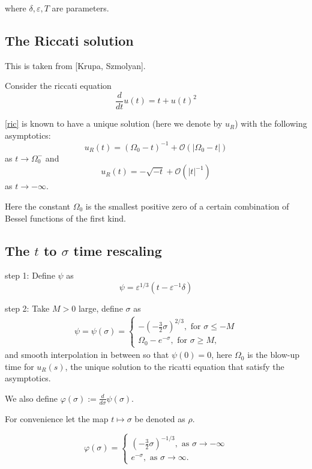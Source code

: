 \documentclass[letterpaper,11pt]{article}
\newcommand{\rmO}{\mathcal{O}}
\newcommand{\eps}{\varepsilon}
\numberwithin{equation}{section}
\theoremstyle{plain}
\begin{document}
where $\delta,\eps, T$ are parameters.

\subsection{The Riccati solution}
This is taken from [Krupa, Szmolyan].

Consider the riccati equation
\begin{equation}\label{ric}
\frac{d}{dt}u(t) = t+u(t)^2
\end{equation}

\eqref{ric} is known to have a unique solution (here we denote by $u_R$) with the following asymptotics:
\[
u_R(t) = (\Omega_0-t)^{-1} + \rmO(|\Omega_0-t|)
\] as $t \to \Omega_0^-$ and
\[
u_R(t) = -\sqrt{-t} + \rmO( |t|^{-1})
\] as $t \to -\infty$.

Here the constant $\Omega_0$ is the smallest positive zero of a certain combination of Bessel functions of the first kind. 

\subsection{The \texorpdfstring{$t$}{t} to \texorpdfstring{$\sigma$}{sigma} time rescaling}

step 1: Define $\psi$ as
\[
\psi = \eps^{1/3}(t - \eps^{-1}\delta)
\]

step 2:
Take $M>0$ large, define $\sigma$ as
\begin{align*}
\psi = \psi(\sigma) =\begin{cases}
-(-\frac{3}{2} \sigma)^{2/3} , \text{ for }\sigma \le -M\\
\Omega_0 -e^{-\sigma}, \text{ for }\sigma \ge M,
\end{cases}
\end{align*}
and smooth interpolation in between so that $\psi(0) = 0$, here $\Omega_0$ is the blow-up time for $u_R(s)$, the unique solution to the ricatti equation that satisfy the asymptotics.

We also define $\varphi(\sigma) := \frac{d}{d\sigma}\psi(\sigma)$.

For convenience let the map $t \mapsto \sigma$ be denoted as $\rho$.

\iffalse
\begin{equation*}
\varphi(\sigma) =\begin{cases}
 (-\frac{3}{2}\sigma)^{-1/3}, \text{ as }\sigma \to -\infty\\
e^{-\sigma} , \text{ as }\sigma \to \infty.
\end{cases}
\end{equation*}
\end{document}
